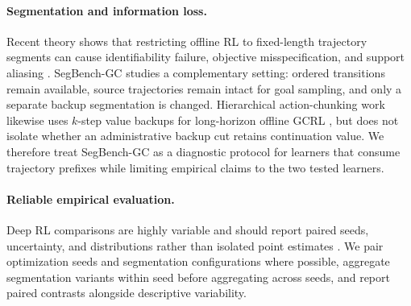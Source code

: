 \paragraph{Segmentation and information loss.}
Recent theory shows that restricting offline RL to fixed-length trajectory segments can cause identifiability failure, objective misspecification, and support aliasing \cite{nidadala2026horizon}. SegBench-GC studies a complementary setting: ordered transitions remain available, source trajectories remain intact for goal sampling, and only a separate backup segmentation is changed. Hierarchical action-chunking work likewise uses $k$-step value backups for long-horizon offline GCRL \cite{jawaid2026hiqc}, but does not isolate whether an administrative backup cut retains continuation value. We therefore treat SegBench-GC as a diagnostic protocol for learners that consume trajectory prefixes while limiting empirical claims to the two tested learners.

\paragraph{Reliable empirical evaluation.}
Deep RL comparisons are highly variable and should report paired seeds, uncertainty, and distributions rather than isolated point estimates \cite{agarwal2021statistical}. We pair optimization seeds and segmentation configurations where possible, aggregate segmentation variants within seed before aggregating across seeds, and report paired contrasts alongside descriptive variability.
